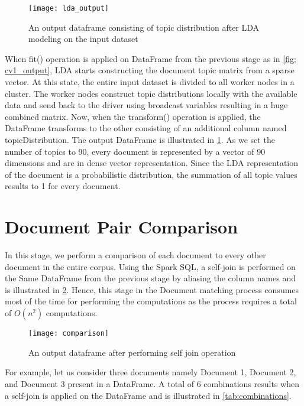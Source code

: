 \begin{figure}[htbp]
	\centering
		\texttt{[image: lda\_output]}
	\caption{An output dataframe consisting of topic distribution after LDA modeling on the input dataset }
	\label{fig: lda_output}
\end{figure}

\par When fit() operation is applied on DataFrame from the previous stage as in \ref{fig: cv1_output}, LDA starts constructing the document topic matrix from a sparse vector. At this state, the entire input dataset is divided to all worker nodes in a cluster. The worker nodes construct topic distributions locally with the available data and send back to the driver using broadcast variables resulting in a huge combined matrix. Now, when the  transform() operation is applied, the DataFrame transforms to the other consisting of an additional column named topicDistribution. The output DataFrame is illustrated in \ref{fig: lda_output}. As we set the number of topics to 90, every document is represented by a vector of 90 dimensions and are in dense vector representation.  Since the LDA representation of the document is a probabilistic distribution, the summation of all topic values results to 1 for every document.


\section{Document Pair Comparison}
\label{implement: Document Pair Comparison}
In this stage, we perform a comparison of each document to every other document in the entire corpus. Using the Spark SQL, a self-join is performed on the Same DataFrame from the previous stage by aliasing the column names and is illustrated in \ref{fig: comparison}. Hence, this stage in the Document matching process consumes most of the time for performing the computations as the process requires a total of  \(O(n^2)\) computations.

\begin{figure}[htbp]
	\centering
		\texttt{[image: comparison]}
	\caption{An output dataframe after performing self join operation }
	\label{fig: comparison}
\end{figure}



For example, let us consider three documents namely Document 1, Document 2, and Document 3 present in a DataFrame. A total of 6 combinations results when a self-join is applied on the DataFrame and is illustrated in \ref{tab:combinations}. 


